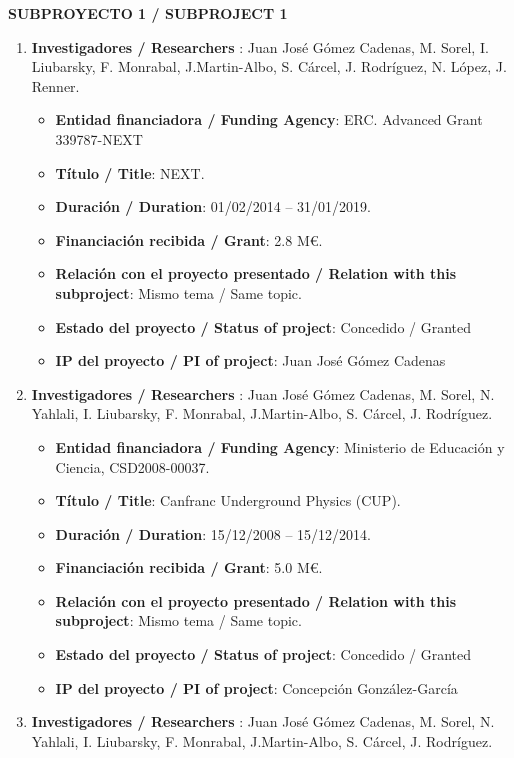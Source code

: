 \noindent\textbf{SUBPROYECTO 1 / SUBPROJECT 1}

\begin{enumerate}
\item {\bf Investigadores / Researchers }: Juan José Gómez Cadenas, M. Sorel, I. Liubarsky, F. Monrabal, J.Martin-Albo, S. Cárcel, J. Rodríguez, N. López, J. Renner.
\begin{itemize}
\item {\bf Entidad financiadora / Funding Agency}: ERC. Advanced Grant 339787-NEXT 
\item {\bf Título / Title}:  NEXT.
\item {\bf Duración / Duration}: 01/02/2014 -- 31/01/2019. 
\item {\bf Financiación recibida / Grant}: 2.8 M\euro. 
\item {\bf Relación con el proyecto presentado / Relation with this subproject}: Mismo tema / Same topic. 
\item {\bf Estado del proyecto / Status of project}: Concedido / Granted
\item {\bf IP del proyecto / PI of project}: Juan José Gómez Cadenas
\end{itemize}
\item {\bf Investigadores / Researchers }: Juan José Gómez Cadenas, M. Sorel, N. Yahlali, I. Liubarsky, F. Monrabal, J.Martin-Albo, S. Cárcel, J. Rodríguez.
\begin{itemize}
\item {\bf Entidad financiadora / Funding Agency}: Ministerio de Educaci\'on y Ciencia, CSD2008-00037.
\item {\bf Título / Title}:  Canfranc Underground Physics (CUP).
\item {\bf Duración / Duration}: 15/12/2008 -- 15/12/2014. 
\item {\bf Financiación recibida / Grant}: 5.0 M\euro. 
\item {\bf Relación con el proyecto presentado / Relation with this subproject}: Mismo tema / Same topic. 
\item {\bf Estado del proyecto / Status of project}: Concedido / Granted
\item {\bf IP del proyecto / PI of project}: Concepción González-García 
\end{itemize}
\item {\bf Investigadores / Researchers }: Juan José Gómez Cadenas, M. Sorel, N. Yahlali, I. Liubarsky, F. Monrabal, J.Martin-Albo, S. Cárcel, J. Rodríguez.
\begin{itemize}

\end{itemize}
\end{enumerate}
